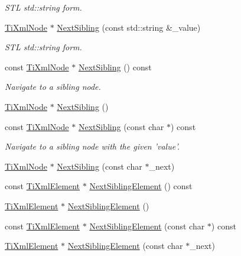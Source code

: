 \begin{DoxyCompactItemize}
\begin{DoxyCompactList}\small\item\em S\-T\-L std\-::string form. \end{DoxyCompactList}\item 
\hyperlink{class_ti_xml_node}{Ti\-Xml\-Node} $\ast$ \hyperlink{class_ti_xml_node_a1757c1f4d01e8c9596ffdbd561c76aea}{Next\-Sibling} (const std\-::string \&\-\_\-value)
\begin{DoxyCompactList}\small\item\em S\-T\-L std\-::string form. \end{DoxyCompactList}\item 
const \hyperlink{class_ti_xml_node}{Ti\-Xml\-Node} $\ast$ \hyperlink{class_ti_xml_node_af854baeba384f5fe9859f5aee03b548e}{Next\-Sibling} () const 
\begin{DoxyCompactList}\small\item\em Navigate to a sibling node. \end{DoxyCompactList}\item 
\hyperlink{class_ti_xml_node}{Ti\-Xml\-Node} $\ast$ \hyperlink{class_ti_xml_node_a4d05f7b1d7b470ac6887edd072d4892a}{Next\-Sibling} ()
\item 
const \hyperlink{class_ti_xml_node}{Ti\-Xml\-Node} $\ast$ \hyperlink{class_ti_xml_node_acaf9dc17531ac041f602f9ad579573ea}{Next\-Sibling} (const char $\ast$) const 
\begin{DoxyCompactList}\small\item\em Navigate to a sibling node with the given 'value'. \end{DoxyCompactList}\item 
\hyperlink{class_ti_xml_node}{Ti\-Xml\-Node} $\ast$ \hyperlink{class_ti_xml_node_a4080bc5cc8a5c139e7cf308669e850fc}{Next\-Sibling} (const char $\ast$\-\_\-next)
\item 
const \hyperlink{class_ti_xml_element}{Ti\-Xml\-Element} $\ast$ \hyperlink{class_ti_xml_node_a7667217e269e0da01d1f82aee94d1a3d}{Next\-Sibling\-Element} () const 
\item 
\hyperlink{class_ti_xml_element}{Ti\-Xml\-Element} $\ast$ \hyperlink{class_ti_xml_node_a1b211cb5034655a04358e0e2f6fc5010}{Next\-Sibling\-Element} ()
\item 
const \hyperlink{class_ti_xml_element}{Ti\-Xml\-Element} $\ast$ \hyperlink{class_ti_xml_node_a3d7897999f99cf4870dd59df6331d7ff}{Next\-Sibling\-Element} (const char $\ast$) const 
\item 
\hyperlink{class_ti_xml_element}{Ti\-Xml\-Element} $\ast$ \hyperlink{class_ti_xml_node_a6e1ac6b800e18049bc75e9f8e63a8e5f}{Next\-Sibling\-Element} (const char $\ast$\-\_\-next)

\end{DoxyCompactItemize}
